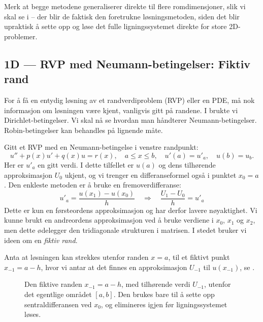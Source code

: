 Merk at begge metodene generaliserer direkte til flere romdimensjoner, slik vi skal se i  -- der blir de faktisk den foretrukne løsningsmetoden, siden det blir upraktisk å sette opp og løse det fulle ligningssystemet direkte for store 2D-problemer.

\subsection{1D — RVP med Neumann-betingelser: Fiktiv rand}\label{sect:fiktivrand}
For å få en entydig løsning av et randverdiproblem (RVP) eller en PDE, må nok informasjon om løsningen være kjent, vanligvis gitt på randene. 
I  brukte vi Dirichlet-betingelser. Vi skal nå se hvordan man håndterer Neumann-betingelser. Robin-betingelser kan behandles på lignende måte.

Gitt et RVP med en Neumann-betingelse i venstre randpunkt:
\[
u'' + p(x)u' + q(x)u = r(x), \quad a \leq x \leq b, \quad u'(a) = u'_a, \quad u(b) = u_b.
\]
Her er \(u'_a\) en gitt verdi. I dette tilfellet er \(u(a)\) og dens tilhørende approksimasjon \(U_0\) ukjent, og vi trenger en differanseformel også i punktet \(x_0 = a\). Den enkleste metoden er å bruke en fremoverdifferanse:
\[
u'_a = \frac{u(x_1) - u(x_0)}{h} \quad \Rightarrow \quad \frac{U_1 - U_0}{h} = u'_a
\]
Dette er kun en førsteordens approksimasjon og har derfor lavere nøyaktighet. Vi kunne brukt en andreordens approksimasjon ved å bruke verdiene i \(x_0\), \(x_1\) og \(x_2\), men dette ødelegger den tridiagonale strukturen i matrisen. I stedet bruker vi ideen om en \textit{fiktiv rand}.

Anta at løsningen kan strekkes utenfor randen \(x = a\), til et fiktivt punkt \(x_{-1} = a - h\), hvor vi antar at det finnes en approksimasjon \(U_{-1}\) til \(u(x_{-1})\), se .

\begin{figure}[htbp]\centering
{}
\caption{Den fiktive randen $x_{-1}=a-h$, med tilhørende verdi $U_{-1}$, utenfor det egentlige området $[a,b]$. Den brukes bare til å sette opp sentraldifferansen ved $x_0$, og elimineres igjen før ligningssystemet løses.}\label{fig:fiktiv_rand}
\end{figure}

